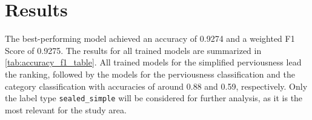

\section{Results}
\label{results}

The best-performing model achieved an accuracy of 0.9274 and a weighted F1 Score of 0.9275.
The results for all trained models are summarized in \autoref{tab:accuracy_f1_table}.
All trained models for the simplified perviousness lead the ranking, followed by the
models for the perviousness classification and the category classification
with accuracies of around 0.88 and 0.59, respectively. Only the label type \texttt{sealed\_simple}
will be considered for further analysis, as it is the most relevant for the study area.

